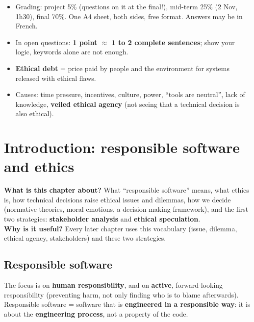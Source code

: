 \documentclass[11pt,a4paper,openany]{book}
\begin{document}
\begin{recapbox}[title={Exam-ready recap --- Getting started}]
\begin{itemize}
  \item Grading: project 5\% (questions on it at the final!), mid-term 25\% (2 Nov, 1h30),
        final 70\%. One A4 sheet, both sides, free format. Answers may be in French.
  \item In open questions: \textbf{1 point $\approx$ 1 to 2 complete sentences}; show your logic,
        keywords alone are not enough.
  \item \textbf{Ethical debt} = price paid by people and the environment for systems released
        with ethical flaws.
  \item Causes: time pressure, incentives, culture, power, ``tools are neutral'', lack of
        knowledge, \textbf{veiled ethical agency} (not seeing that a technical decision is
        also ethical).
\end{itemize}
\end{recapbox}


\chapter{Introduction: responsible software and ethics}

\begin{rembox}[title={In a nutshell}]
\textbf{What is this chapter about?} What ``responsible software'' means, what ethics is, how
technical decisions raise ethical issues and dilemmas, how we decide (normative theories, moral
emotions, a decision-making framework), and the first two strategies: \textbf{stakeholder
analysis} and \textbf{ethical speculation}. \\
\textbf{Why is it useful?} Every later chapter uses this vocabulary (issue, dilemma, ethical
agency, stakeholders) and these two strategies.
\end{rembox}


\section{Responsible software}

\begin{defnbox}[title={Responsible software (van de Poel, 2011)}]
The focus is on \textbf{human responsibility}, and on \textbf{active}, forward-looking
responsibility (preventing harm, not only finding who is to blame afterwards). \\
Responsible software = software that is \textbf{engineered in a responsible way}: it is about
the \textbf{engineering process}, not a property of the code.
\end{defnbox}
\end{document}
